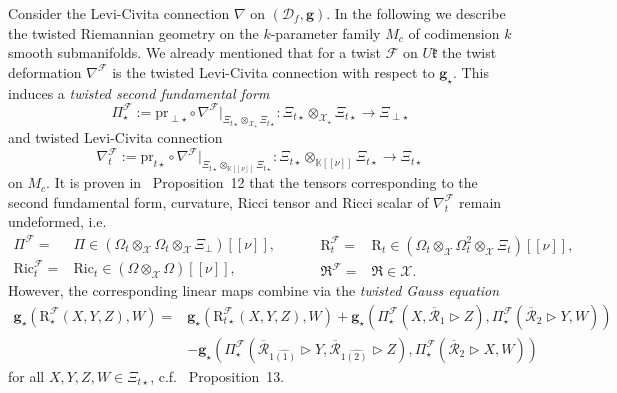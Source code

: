 \documentclass[a4paper,11pt]{article}
\begin{document}
Consider the Levi-Civita connection $\nabla$ on $(\mathcal{D}_f,\mathbf{g})$.
In the following we describe the twisted Riemannian geometry on the $k$-parameter
family $M_c$ of codimension $k$ smooth submanifolds.
We already mentioned that for a twist $\mathcal{F}$ on $U\mathfrak{k}$ the twist
deformation $\nabla^\mathcal{F}$ is the twisted Levi-Civita connection with respect to
$\mathbf{g}_\star$. This induces a \textit{twisted second fundamental form}
\begin{equation}
    \Pi_\star^\mathcal{F}:=\mathrm{pr}_{\perp\star}\circ\nabla^\mathcal{F}|_{
    \Xi_{t\star}\otimes_{\mathcal{X}_\star}\Xi_{t\star}}
    \colon\Xi_{t\star}\otimes_{\mathcal{X}_\star}\Xi_{t\star}\rightarrow\Xi_{\perp\star}
\end{equation}
and twisted Levi-Civita connection
\begin{equation}
    \nabla_t^\mathcal{F}:=\mathrm{pr}_{t\star}\circ\nabla^\mathcal{F}|_{
    \Xi_{t\star}\otimes_{\mathbb{K}[[\nu]]}\Xi_{t\star}}
    \colon\Xi_{t\star}\otimes_{\mathbb{K}[[\nu]]}\Xi_{t\star}\rightarrow\Xi_{t\star}
\end{equation}
on $M_c$. It is proven in \cite{FioreWeber}~Proposition~12 that the tensors
corresponding to the second fundamental form, curvature, Ricci tensor and Ricci
scalar of $\nabla^\mathcal{F}_t$ remain undeformed, i.e.
\begin{equation}
\begin{split}
    \Pi^\mathcal{F}=&
    \Pi\in(\Omega_t\otimes_\mathcal{X}\Omega_t\otimes_\mathcal{X}\Xi_\perp)[[\nu]],\\
    \mathrm{Ric}_t^\mathcal{F}
    =&\mathrm{Ric}_t\in(\Omega\otimes_\mathcal{X}\Omega)[[\nu]],
\end{split}
\hspace{1cm}
\begin{split}
    \mathrm{R}_t^\mathcal{F}=&\mathrm{R}_t
    \in(\Omega_t\otimes_\mathcal{X}\Omega_t^2\otimes_\mathcal{X}\Xi_t)[[\nu]],\\
    \mathfrak{R}^\mathcal{F}=&\mathfrak{R}\in\mathcal{X}.
\end{split}
\end{equation}
However, the corresponding linear maps combine via the
\textit{twisted Gauss equation}
\begin{equation}
\begin{split}
    \mathbf{g}_\star(\mathrm{R}_\star^\mathcal{F}(X,Y,Z),W)
    =&\mathbf{g}_\star(\mathrm{R}_{t\star}^\mathcal{F}(X,Y,Z),W)
    +\mathbf{g}_\star(\Pi_\star^\mathcal{F}(X,\overline{\mathcal{R}}_1\rhd Z),
    \Pi_\star^\mathcal{F}(\overline{\mathcal{R}}_2\rhd Y,W))\\
    &-\mathbf{g}_\star(
    \Pi_\star^\mathcal{F}(\overline{\mathcal{R}}_{1\widehat{(1)}}\rhd Y,
    \overline{\mathcal{R}}_{1\widehat{(2)}}\rhd Z),
    \Pi_\star^\mathcal{F}(\overline{\mathcal{R}}_2\rhd X,W))
\end{split}
\end{equation}
for all $X,Y,Z,W\in\Xi_{t\star}$, c.f. \cite{FioreWeber}~Proposition~13.
\end{document}

